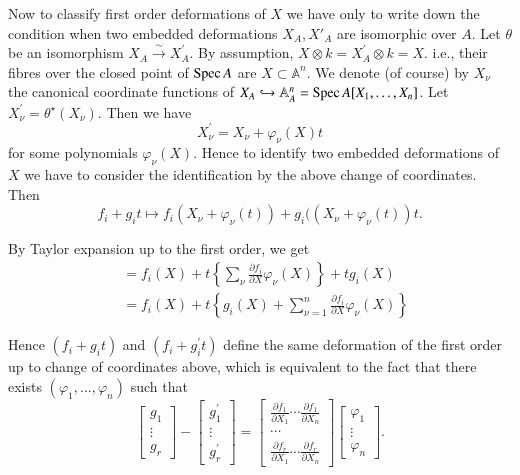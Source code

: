 {Now to classify first order deformations of $X$ we have only to write
down the condition when two embedded deformations $X_A, X'_{A}$ are
isomorphic over $A$. Let $\theta$ be an isomorphism
$X_A \xrightarrow{\sim} X_{A}^{'}$. By assumption, $X\otimes k=
X_{A}^{'}\otimes k=X$. i.e., their fibres over the closed point of
$\operatorname{Spec} A$ are $X\subset \mathbb{A}^{n}$. We denote (of course) by
$X_\nu$ the canonical coordinate functions of
$X_A\hookrightarrow \mathbb{A}_{A}^{n}=\operatorname{Spec} A[X_1,\ldots, X_n]$. Let
$X_{\nu}^{'}=\theta^{\star}(X_\nu)$. Then we have 
$$
X_{\nu}^{'}=X_{\nu}+\varphi_{\nu}(X)t
$$
for some polynomials $\varphi_{\nu}(X)$. Hence to identify two
embedded deformations of $X$ we have to consider the identification by
the above change of coordinates. Then 
$$
f_i+g_it\mapsto f_i(X_{\nu}+\varphi_{\nu}(t))+g_i((X_{\nu}+\varphi_{\nu}(t))t.
$$

By Taylor expansion up to the first order, we get
\begin{align*}
&=f_i(X)+t\left\{\displaystyle\mathop{\sum}_{\nu}\frac{\partial
f_i}{\partial X}\varphi_{\nu}(X)\right\}+tg_i(X)\\ 
&=f_i(X)+t\left\{g_i(X)+\sum_{\nu=1}^{n}\frac{\partial f_i}{\partial X}\varphi_{\nu}(X)\right\}
\end{align*}

Hence $(f_i+g_it)$ and $(f_i+g_{i}^{'}t)$ define the same deformation
of the first order up to change of coordinates above, which is
equivalent to the fact that there exists
$(\varphi_1,\ldots,\varphi_n)$ such that 
\begin{equation*}
\begin{bmatrix}
g_1\\
\vdots\\
g_r
\end{bmatrix}-\begin{bmatrix}
g_{1}^{'}\\
\vdots\\
g_{r}^{'}
\end{bmatrix}=\begin{bmatrix}
\frac{\partial f_1}{\partial X_1}\cdots\frac{\partial f_1}{\partial X_n}\\
\cdots\\
\frac{\partial f_r}{\partial X_1}\cdots \frac{\partial f_r}{\partial X_n}
\end{bmatrix}\begin{bmatrix}
\varphi_1\\
\vdots\\
\varphi_n
\end{bmatrix}.\tag{*}
\end{equation*}\pageoriginale

}
